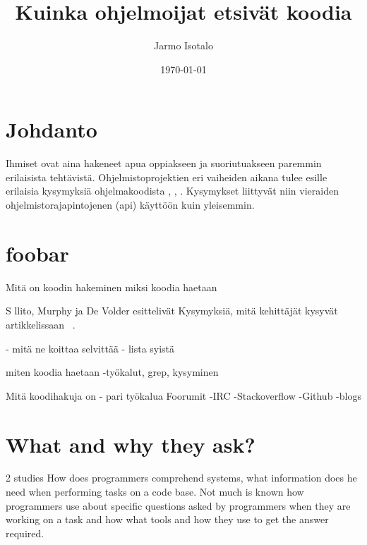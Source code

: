 \documentclass[finnish]{../tktltiki2}
\title{Kuinka ohjelmoijat etsivät koodia}
\author{Jarmo Isotalo}
\date{\today}
\theoremstyle{definition}
\theoremstyle{remark}
\begin{document}

\frontmatter      %

\maketitle        %

\tableofcontents  %


\mainmatter       %

\section{Johdanto}
Ihmiset ovat aina hakeneet apua oppiakseen ja suoriutuakseen paremmin erilaisista tehtävistä. %
Ohjelmistoprojektien eri vaiheiden aikana tulee esille erilaisia kysymyksiä ohjelmakoodista \cite{g_search_code}, \cite{questions-during-software-evolution-tasks}, \cite{asking-and-answering-api-questions}.
Kysymykset liittyvät niin vieraiden ohjelmistorajapintojenen (api) käyttöön \cite{jungloid-mining} kuin yleisemmin.

\section{foobar}
Mitä on koodin hakeminen
miksi koodia haetaan

S
llito, Murphy ja De Volder esittelivät Kysymyksiä, mitä kehittäjät kysyvät artikkelissaan ~\cite{questions-during-software-evolution-tasks}.

- mitä ne koittaa selvittää
  - lista syistä

miten koodia haetaan
-työkalut, grep, kysyminen

Mitä koodihakuja on
- pari työkalua
Foorumit
-IRC
-Stackoverflow
-Github
-blogs




\section{What and why they ask?}
2 studies
How does programmers comprehend systems, what information does he need when performing tasks on a code base.
Not much is known how programmers use about specific questions asked by programmers when they are working on a task and how what tools and how they use to get the answer required.
\end{document}
